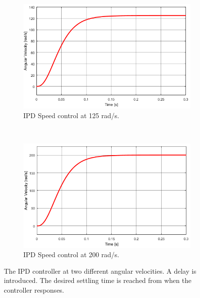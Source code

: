 \begin{figure}[h!]
	\centering
	\begin{subfigure}[b]{0.45\textwidth}
		\includegraphics[width=\textwidth]{graphics/IPD_single125}
		\caption{IPD Speed control at 125 rad/s.}
		\label{fig:ipdsingle125}
	\end{subfigure}
	~ %
	\begin{subfigure}[b]{0.45\textwidth}
		\includegraphics[width=\textwidth]{graphics/IPD_single200}
		\caption{IPD Speed control at 200 rad/s.}
		\label{fig:ipdsingle200}
	\end{subfigure}
	\caption{The IPD controller at two different angular velocities. A delay is introduced. The desired settling time is reached from when the controller responses.}\label{fig:ipdsingle}
\end{figure}

